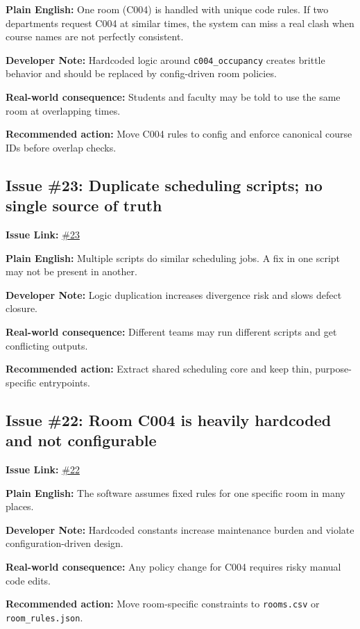 \documentclass[12pt,a4paper]{article}
\begin{document}
\textbf{Plain English:} One room (C004) is handled with unique code rules. If two departments request C004 at similar times, the system can miss a real clash when course names are not perfectly consistent.

\textbf{Developer Note:} Hardcoded logic around \texttt{c004\_occupancy} creates brittle behavior and should be replaced by config-driven room policies.

\textbf{Real-world consequence:} Students and faculty may be told to use the same room at overlapping times.

\textbf{Recommended action:} Move C004 rules to config and enforce canonical course IDs before overlap checks.

\subsection*{Issue \#23: Duplicate scheduling scripts; no single source of truth}
\textbf{Issue Link:} \href{https://github.com/ArnavBallinCode/TimetableIIITDWD/issues/23}{\#23}

\textbf{Plain English:} Multiple scripts do similar scheduling jobs. A fix in one script may not be present in another.

\textbf{Developer Note:} Logic duplication increases divergence risk and slows defect closure.

\textbf{Real-world consequence:} Different teams may run different scripts and get conflicting outputs.

\textbf{Recommended action:} Extract shared scheduling core and keep thin, purpose-specific entrypoints.

\subsection*{Issue \#22: Room C004 is heavily hardcoded and not configurable}
\textbf{Issue Link:} \href{https://github.com/ArnavBallinCode/TimetableIIITDWD/issues/22}{\#22}

\textbf{Plain English:} The software assumes fixed rules for one specific room in many places.

\textbf{Developer Note:} Hardcoded constants increase maintenance burden and violate configuration-driven design.

\textbf{Real-world consequence:} Any policy change for C004 requires risky manual code edits.

\textbf{Recommended action:} Move room-specific constraints to \texttt{rooms.csv} or \texttt{room\_rules.json}.
\end{document}
